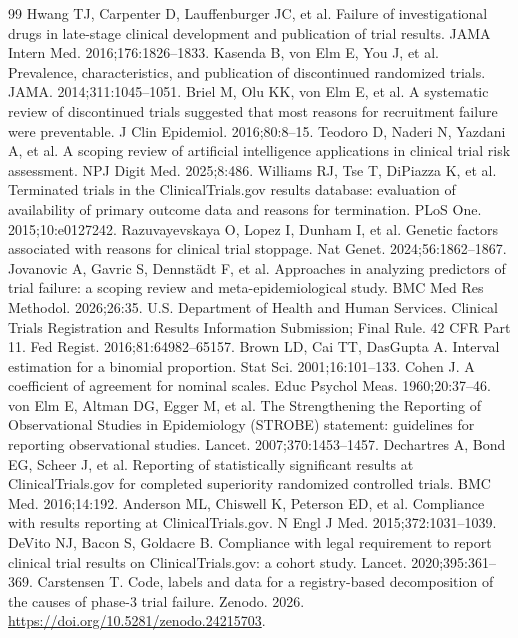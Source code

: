 \documentclass[preprint,11pt]{elsarticle}
\begin{document}
\begin{thebibliography}{99}
 Hwang TJ, Carpenter D, Lauffenburger JC, et al. Failure of investigational drugs in late-stage clinical development and publication of trial results. JAMA Intern Med. 2016;176:1826--1833.
 Kasenda B, von Elm E, You J, et al. Prevalence, characteristics, and publication of discontinued randomized trials. JAMA. 2014;311:1045--1051.
 Briel M, Olu KK, von Elm E, et al. A systematic review of discontinued trials suggested that most reasons for recruitment failure were preventable. J Clin Epidemiol. 2016;80:8--15.
 Teodoro D, Naderi N, Yazdani A, et al. A scoping review of artificial intelligence applications in clinical trial risk assessment. NPJ Digit Med. 2025;8:486.
 Williams RJ, Tse T, DiPiazza K, et al. Terminated trials in the ClinicalTrials.gov results database: evaluation of availability of primary outcome data and reasons for termination. PLoS One. 2015;10:e0127242.
 Razuvayevskaya O, Lopez I, Dunham I, et al. Genetic factors associated with reasons for clinical trial stoppage. Nat Genet. 2024;56:1862--1867.
 Jovanovic A, Gavric S, Dennst\"adt F, et al. Approaches in analyzing predictors of trial failure: a scoping review and meta-epidemiological study. BMC Med Res Methodol. 2026;26:35.
 U.S. Department of Health and Human Services. Clinical Trials Registration and Results Information Submission; Final Rule. 42 CFR Part 11. Fed Regist. 2016;81:64982--65157.
 Brown LD, Cai TT, DasGupta A. Interval estimation for a binomial proportion. Stat Sci. 2001;16:101--133.
 Cohen J. A coefficient of agreement for nominal scales. Educ Psychol Meas. 1960;20:37--46.
 von Elm E, Altman DG, Egger M, et al. The Strengthening the Reporting of Observational Studies in Epidemiology (STROBE) statement: guidelines for reporting observational studies. Lancet. 2007;370:1453--1457.
 Dechartres A, Bond EG, Scheer J, et al. Reporting of statistically significant results at ClinicalTrials.gov for completed superiority randomized controlled trials. BMC Med. 2016;14:192.
 Anderson ML, Chiswell K, Peterson ED, et al. Compliance with results reporting at ClinicalTrials.gov. N Engl J Med. 2015;372:1031--1039.
 DeVito NJ, Bacon S, Goldacre B. Compliance with legal requirement to report clinical trial results on ClinicalTrials.gov: a cohort study. Lancet. 2020;395:361--369.
 Carstensen T. Code, labels and data for a registry-based decomposition of the causes of phase-3 trial failure. Zenodo. 2026. \url{https://doi.org/10.5281/zenodo.24215703}.
\end{thebibliography}
\end{document}
